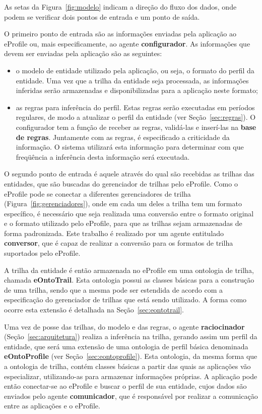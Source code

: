 As setas da Figura~\ref{fig:modelo} indicam a direção do fluxo dos dados, onde podem se verificar dois pontos de entrada e um ponto de saída.

O primeiro ponto de entrada são as informações enviadas pela aplicação ao eProfile ou, mais especificamente, ao agente {\bf configurador}. As informações que devem ser enviadas pela aplicação são as seguintes:

\begin{itemize}

\item o modelo de entidade utilizado pela aplicação, ou seja, o formato do perfil da entidade. Uma vez que a trilha da entidade seja processada, as informações inferidas serão armazenadas e disponibilizadas para a aplicação neste formato;

\item as regras para inferência do perfil. Estas regras serão executadas em períodos regulares, de modo a atualizar o perfil da entidade (ver Seção~\ref{sec:regras}). O configurador tem a função de receber as regras, validá-las e inserí-las na \textbf{base de regras}. Juntamente com as regras, é especificado a criticidade da informação. O sistema utilizará esta informação para determinar com que freqüência a inferência desta informação será executada.

\end{itemize}

O segundo ponto de entrada é aquele através do qual são recebidas as trilhas das entidades, que são buscadas do gerenciador de trilhas pelo eProfile. Como o eProfile pode se conectar a diferentes gerenciadores de trilha (Figura~\ref{fig:gerenciadores}), onde em cada um deles a trilha tem um formato específico, é necessário que seja realizada uma conversão entre o formato original e o formato utilizado pelo eProfile, para que as trilhas sejam armazenadas de forma padronizada. Este trabalho é realizado por um agente entitulado {\bf conversor}, que é capaz de realizar a conversão para os formatos de trilha suportados pelo eProfile.

A trilha da entidade é então armazenada no eProfile em uma ontologia de trilha, chamada {\bf eOntoTrail}. Esta ontologia possui as classes básicas para a construção de uma trilha, sendo que a mesma pode ser estendida de acordo com a especificação do gerenciador de trilhas que está sendo utilizado. A forma como ocorre esta extensão é detalhada na Seção~\ref{sec:eontotrail}.

Uma vez de posse das trilhas, do modelo e das regras, o agente \textbf{raciocinador} (Seção~\ref{sec:arquitetura}) realiza a inferência na trilha, gerando assim um perfil da entidade, que será uma extensão de uma ontologia de perfil básica denominada {\bf eOntoProfile} (ver Seção~\ref{sec:eontoprofile}). Esta ontologia, da mesma forma que a ontologia de trilha, contém classes básicas a partir das quais as aplicações vão especializar, utilizando-as para armazenar informações próprias. A aplicação pode então conectar-se ao eProfile e buscar o perfil de sua entidade, cujos dados são enviados pelo agente \textbf{comunicador}, que é responsável por realizar a comunicação entre as aplicações e o eProfile.






